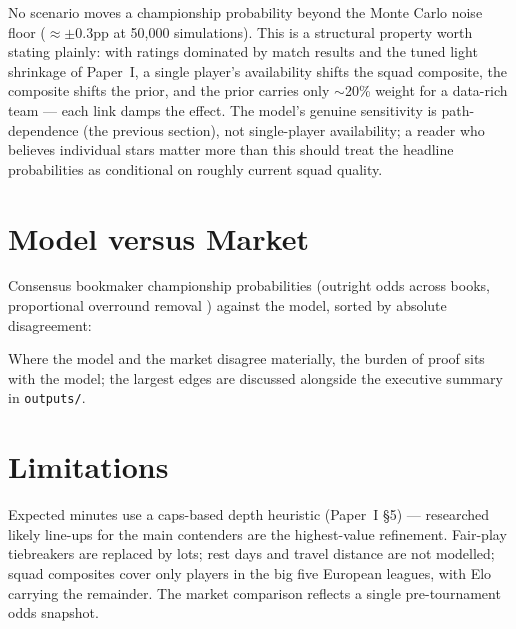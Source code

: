 \documentclass[11pt]{article}
\begin{document}


No scenario moves a championship probability beyond the Monte Carlo noise
floor ($\approx \pm 0.3$pp at 50{,}000 simulations). This is a structural
property worth stating plainly: with ratings dominated by match results and
the tuned light shrinkage of Paper~I, a single player's availability shifts
the squad composite, the composite shifts the prior, and the prior carries
only $\sim$20\% weight for a data-rich team --- each link damps the effect.
The model's genuine sensitivity is path-dependence (the previous section),
not single-player availability; a reader who believes individual stars matter
more than this should treat the headline probabilities as conditional on
roughly current squad quality.

\section{Model versus Market}
Consensus bookmaker championship probabilities (outright odds across books,
proportional overround removal \cite{oddsapi}) against the model, sorted by
absolute disagreement:



Where the model and the market disagree materially, the burden of proof sits
with the model; the largest edges are discussed alongside the executive
summary in \texttt{outputs/}.

\section{Limitations}
Expected minutes use a caps-based depth heuristic (Paper~I \S5) --- researched
likely line-ups for the main contenders are the highest-value refinement.
Fair-play tiebreakers are replaced by lots; rest days and travel distance are
not modelled; squad composites cover only players in the big five European
leagues, with Elo carrying the remainder. The market comparison reflects a
single pre-tournament odds snapshot.



\end{document}

